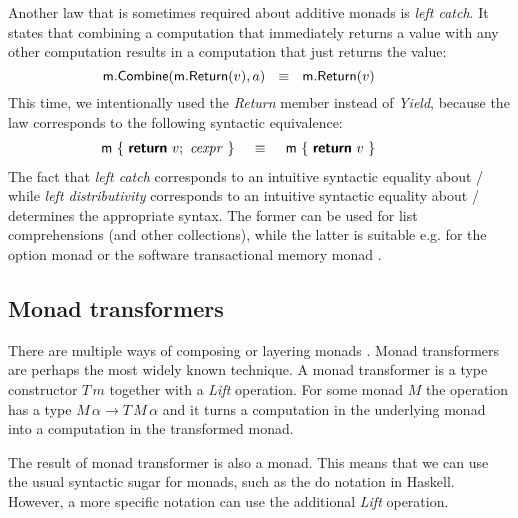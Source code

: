 \documentclass[runningheads,a4paper]{llncs}
\begin{document}
Another law that is sometimes required about additive monads is \emph{left catch}. It states that
combining a computation that immediately returns a value with any other computation results in 
a computation that just returns the value:
%
\begin{equation*}
\hspace{-3em}
\ident{m}.\ident{Combine}(\ident{m}.\ident{Return}(v), a)
~~\equiv~~
\ident{m}.\ident{Return}(v)
\end{equation*}
%
This time, we intentionally used the \emph{Return} member instead of \emph{Yield}, because the law
corresponds to the following syntactic equivalence:
%
\begin{equation*}
\hspace{-3em}
\begin{array}{l}
\ident{m}~\{~  \kvd{return}~v; ~ \cexpr~\}
\end{array}~~\equiv~~
\begin{array}{l}
\ident{m}~\{~  \kvd{return}~v~\}\\
\end{array}
\end{equation*}
%
The fact that \emph{left catch} corresponds to an intuitive syntactic equality about 
/ while \emph{left distributivity} corresponds to an intuitive syntactic equality
about / determines the appropriate syntax. The former can be used
for list comprehensions (and other collections), while the latter is suitable e.g. for the 
option monad or the software transactional memory monad \cite{stm}.

\subsection{Monad transformers}
\label{sec:laws-transf}

There are multiple ways of composing or layering monads \cite{monad-transformers,monad-compose}. 
Monad transformers are perhaps the most widely known technique. A monad transformer is a type 
constructor $T\,m$ together with a \emph{Lift} operation. For some monad $M$ the operation has 
a type $M\,\alpha \rightarrow T\,M\,\alpha$ and it turns a computation in the underlying monad 
into a computation in the transformed monad.

The result of monad transformer is also a monad. This means that we can use the usual syntactic 
sugar for monads, such as the do notation in Haskell. However, a more specific notation can
use the additional \emph{Lift} operation.
\end{document}
